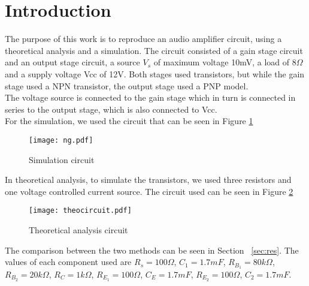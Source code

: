 \section{Introduction}
The purpose of this work is to reproduce an audio amplifier circuit, using a theoretical analysis and a simulation. The circuit consisted of a gain stage circuit and an output stage circuit, a source $V_s$ of maximum voltage 10mV, a load of 8$\Omega$ and a supply voltage Vcc of 12V. Both stages used transistors, but while the gain stage used a NPN transistor, the output stage used a PNP model.\\
The voltage source is connected to the gain stage which in turn is connected in series to the output stage, which is also connected to Vcc.\\
For the simulation, we used the circuit that can be seen in Figure \ref{fig:circngspice}
\begin{figure}[H] \centering
\texttt{[image: ng.pdf]}
\caption{Simulation circuit}
\label{fig:circngspice}
\end{figure} 
In theoretical analysis, to simulate the transistors, we used three resistors and one voltage controlled current source. The circuit used can be seen in Figure \ref{fig:circoc}

\begin{figure}[H] \centering
\texttt{[image: theocircuit.pdf]}
\caption{Theoretical analysis circuit}
\label{fig:circoc}
\end{figure} 
The comparison between the two methods can be seen in Section ~\ref{sec:res}.
The values of each component used are $R_s=100\Omega$, $C_1=1.7 mF$, $R_{B_1}=80k\Omega$, $R_{B_2}=20k\Omega$, $R_C=1k\Omega$, $R_{E_1}=100\Omega$, $C_E=1.7 mF$, $R_{E_2}=100\Omega$, $C_{2}=1.7mF$.

